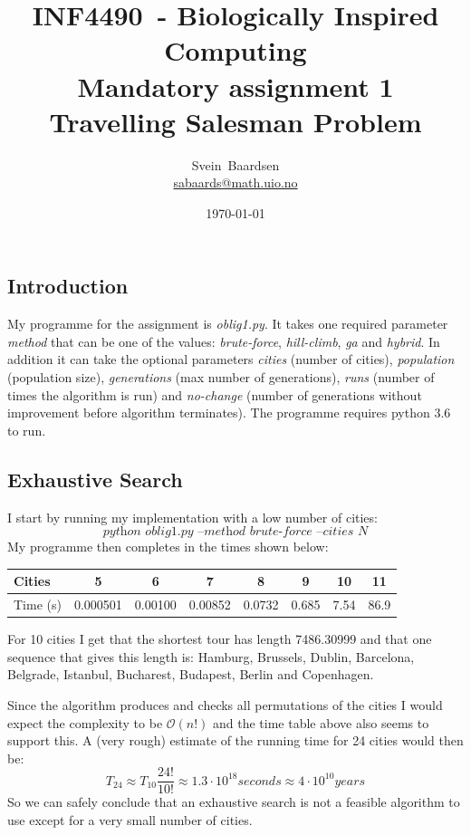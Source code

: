 \documentclass[11pt]{article}
\makeatletter
\newcommand{\name}{Svein~Baardsen}
\newcommand{\mail}{\href{mailto:sabaards@math.uio.no}{sabaards@math.uio.no}}
\newcommand{\course}{INF4490}
\newcommand{\project}{Mandatory assignment 1\\Travelling Salesman Problem}
\newcommand{\bigO}[1]{\mathcal{O}\left(#1\right)}
\makeatother
\begin{document}
\lstset{language=Python,numbers=left,frame=single,tabsize=2}
\title{\course~- Biologically Inspired Computing\\\project}
\author{\name\\\mail}
\date{\today}
\maketitle \thispagestyle{plain} %
\setlength{\parindent}{0pt}\setlength{\parskip}{11pt}%

\subsection*{Introduction}
My programme for the assignment is \textit{oblig1.py}. It takes one required parameter \textit{method} that can be one of the values: \textit{brute-force}, \textit{hill-climb}, \textit{ga} and \textit{hybrid}. In addition it can take the optional parameters \textit{cities} (number of cities), \textit{population} (population size), \textit{generations} (max number of generations), \textit{runs} (number of times the algorithm is run) and \textit{no-change} (number of generations without improvement before algorithm terminates). The programme requires python 3.6 to run.

\clearpage
\subsection{Exhaustive Search}
I start by running my implementation with a low number of cities: 
\[\textit{python oblig1.py --method brute-force --cities N}\] 
My programme then completes in the times shown below:

\begin{tabular}{l*{7}{|c}}
	Cities & 5 & 6 & 7 & 8 & 9 & 10 & 11\\
	\hline
	Time (s) & 0.000501 & 0.00100 & 0.00852 & 0.0732 & 0.685 & 7.54 & 86.9
\end{tabular}

For 10 cities I get that the shortest tour has length 7486.30999 and that one sequence that gives this length is: Hamburg, Brussels, Dublin, Barcelona, Belgrade, Istanbul, Bucharest, Budapest, Berlin and Copenhagen. 

Since the algorithm produces and checks all permutations of the cities I would expect the complexity to be \(\bigO{n!}\) and the time table above also seems to support this. A (very rough) estimate of the running time for 24 cities would then be:
\[T_{24}\approx T_{10}\frac{24!}{10!}\approx 1.3\cdot10^{18} seconds \approx 4\cdot10^{10} years\]
So we can safely conclude that an exhaustive search is not a feasible algorithm to use except for a very small number of cities.
\end{document}
